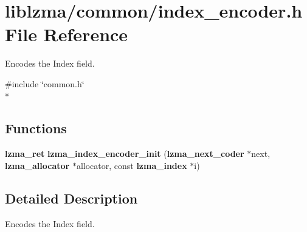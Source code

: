 \section{liblzma/common/index\-\_\-encoder.h File Reference}
\label{index__encoder_8h}


Encodes the Index field.  


{\ttfamily \#include \char`\"{}common.\-h\char`\"{}}\\*
\subsection*{Functions}
\begin{DoxyCompactItemize}
\item 
{\bf lzma\-\_\-ret} {\bfseries lzma\-\_\-index\-\_\-encoder\-\_\-init} ({\bf lzma\-\_\-next\-\_\-coder} $\ast$next, {\bf lzma\-\_\-allocator} $\ast$allocator, const {\bf lzma\-\_\-index} $\ast$i)\label{index__encoder_8h_a8a142f42c47076fee7c1963102776ac0}

\end{DoxyCompactItemize}


\subsection{Detailed Description}
Encodes the Index field. 
